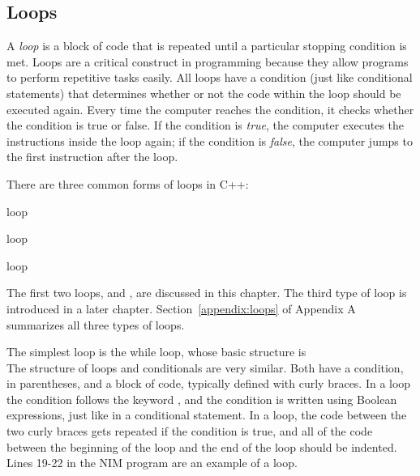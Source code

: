 \subsection{Loops}

A \emph{loop} is a block of code that is repeated until a particular stopping condition is met.  
Loops are a critical construct in programming because they allow programs to perform repetitive tasks easily.  All loops have a condition (just like conditional statements) that determines whether or not the code within the loop should be executed again. 
Every time the computer reaches the condition, it checks whether the condition is true or false.  If the condition is \emph{true}, the computer executes the instructions inside the loop again; if the condition is \emph{false}, the computer jumps to the first instruction after the loop.  

There are three common forms of loops in C++:\begin{tight_enumerate}
\item {} loop
\item {} loop
\item {} loop
\end{tight_enumerate}
The first two loops,  and , are discussed in this chapter.  The third type of loop is introduced in a later chapter.  Section~\ref{appendix:loops} of Appendix A summarizes all three types of loops.  

The simplest loop is the while loop, whose basic structure is\\
The structure of loops and conditionals are very similar.  Both have a condition, in parentheses, and a block of code, typically defined with curly braces.  In a  loop the condition follows the keyword , and the condition is written using Boolean expressions, just like in a conditional statement.
In a loop, the code between the two curly braces gets repeated if the condition is true, and all of the code between the beginning of the loop and the end of the loop should be indented.  Lines 19-22 in the NIM program are an example of a  loop.

